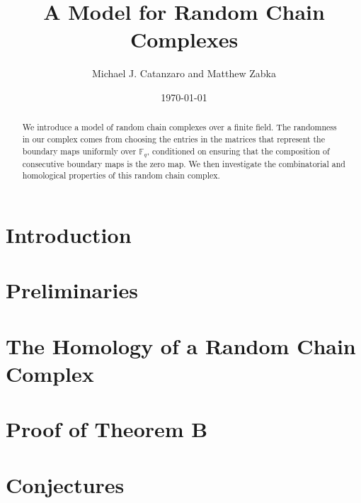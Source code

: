 \documentclass{amsart}
\title{A Model for Random Chain Complexes}
\author{Michael J. Catanzaro and Matthew Zabka}
\date{\today}
\theoremstyle{remark}
\begin{document}
\begin{abstract}
We introduce a model of random chain complexes over a finite
field. The randomness in our complex comes from choosing the entries in the
matrices that represent the boundary maps uniformly over $\mathbb{F}_q$,
conditioned on ensuring that the composition of consecutive boundary maps is
the zero map.  We then investigate the combinatorial and homological 
properties of this random chain complex.
\end{abstract}
\maketitle


\section{Introduction}

\section{Preliminaries}

\section{The Homology of a Random Chain Complex}\label{SecCondComp}

\section{Proof of Theorem B}

\section{Conjectures}




  
\end{document}
